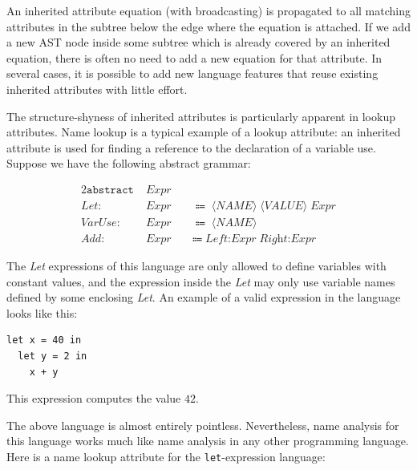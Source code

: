 \documentclass[10pt, twoside, openright]{book}
\begin{document}
An inherited attribute equation (with broadcasting) is propagated to all matching attributes in the subtree below
the edge where the equation is attached.  If we add a new
AST node inside some subtree which is already covered by an inherited equation,
there is often no need to add a new equation for that attribute. In several cases,
it is possible to add new language features that reuse existing inherited attributes with
little effort.

The structure-shyness of inherited attributes is particularly apparent in lookup attributes.
Name lookup is a typical example of a lookup attribute: an inherited attribute is used
for finding a reference to the declaration of a variable use. Suppose we have the following
abstract grammar:


\vbox{
\begin{alignat*}{2}
\texttt{abstract} \; & \textit{Expr} \; &&\\
    \textit{Let} : \; &\textit{Expr} \; &&\Coloneqq \; \langle\textit{NAME}\rangle \;
    \langle\textit{VALUE}\rangle \; \textit{Expr} \\
 \textit{VarUse} : \; &\textit{Expr} \; &&\Coloneqq \; \langle\textit{NAME}\rangle \\
\textit{Add} : \; & \textit{Expr} \; &&\Coloneqq \; \textit{Left:Expr} \; \textit{Right:Expr}
\end{alignat*}
}

\noindent
The \emph{Let} expressions of this language are only allowed to define variables with constant
values, and the expression inside the \emph{Let} may only use variable names defined by some
enclosing \emph{Let}.
An example of a valid expression in the language looks like this:

\begin{lstlisting}
let x = 40 in
  let y = 2 in
    x + y
\end{lstlisting}

\noindent
This expression computes the value $42$.

The above language is almost entirely pointless. Nevertheless, name analysis for this language
works much like name analysis in any other programming language. Here is a name lookup
attribute for the \verb'let'-expression language:
\end{document}
